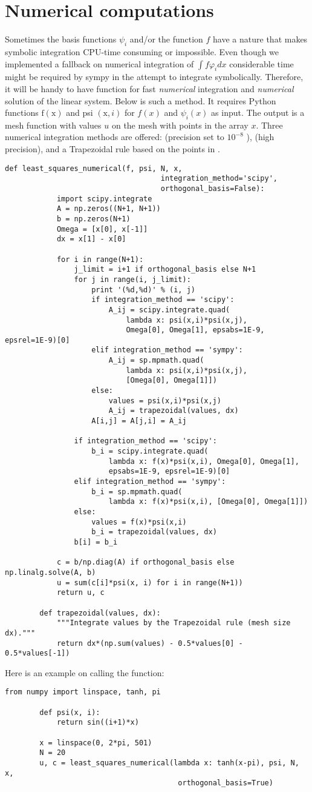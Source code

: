 \documentclass[../main.tex]{subfiles}
\begin{document}
	\section[Numerical computations]{Numerical computations}
	\label{sec:sec_2_9}
	\noindent Sometimes the basis functions $\psi_{i}$ and/or the function $f$ have a nature that makes symbolic integration CPU-time consuming or impossible. Even though we implemented a fallback on numerical integration of $\int f \varphi_{i} d x$ considerable time might be required by sympy in the attempt to integrate symbolically. Therefore, it will be handy to have function for fast \textit{numerical} integration and \textit{numerical} solution of the linear system. Below is such a method. It requires Python functions $\mathrm{f}(\mathrm{x})$ and psi $(\mathrm{x}, i)$ for $f(x)$ and $\psi_{i}(x)$ as input. The output is a mesh function with values $u$ on the mesh with points in the array $x$. Three numerical integration methods are offered:  (precision set to $10^{-8}$ ),  (high precision), and a Trapezoidal rule based on the points in .
	\begin{lstlisting}[numbers=none]
		def least_squares_numerical(f, psi, N, x,
									integration_method='scipy',
									orthogonal_basis=False):
			import scipy.integrate
			A = np.zeros((N+1, N+1))
			b = np.zeros(N+1)
			Omega = [x[0], x[-1]]
			dx = x[1] - x[0]
			
			for i in range(N+1):
				j_limit = i+1 if orthogonal_basis else N+1
				for j in range(i, j_limit):
					print '(%d,%d)' % (i, j)
					if integration_method == 'scipy':
						A_ij = scipy.integrate.quad(
							lambda x: psi(x,i)*psi(x,j),
							Omega[0], Omega[1], epsabs=1E-9, epsrel=1E-9)[0]
					elif integration_method == 'sympy':
						A_ij = sp.mpmath.quad(
							lambda x: psi(x,i)*psi(x,j),
							[Omega[0], Omega[1]])
					else:
						values = psi(x,i)*psi(x,j)
						A_ij = trapezoidal(values, dx)
					A[i,j] = A[j,i] = A_ij
			
				if integration_method == 'scipy':
					b_i = scipy.integrate.quad(			
						lambda x: f(x)*psi(x,i), Omega[0], Omega[1],
						epsabs=1E-9, epsrel=1E-9)[0]
				elif integration_method == 'sympy':
					b_i = sp.mpmath.quad(
						lambda x: f(x)*psi(x,i), [Omega[0], Omega[1]])
				else:
					values = f(x)*psi(x,i)
					b_i = trapezoidal(values, dx)
				b[i] = b_i
			
			c = b/np.diag(A) if orthogonal_basis else np.linalg.solve(A, b)
			u = sum(c[i]*psi(x, i) for i in range(N+1))
			return u, c
			
		def trapezoidal(values, dx):
			"""Integrate values by the Trapezoidal rule (mesh size dx)."""
			return dx*(np.sum(values) - 0.5*values[0] - 0.5*values[-1])
	\end{lstlisting}
	Here is an example on calling the function:
	\begin{lstlisting}[numbers=none]
		from numpy import linspace, tanh, pi
		
		def psi(x, i):
			return sin((i+1)*x)
			
		x = linspace(0, 2*pi, 501)
		N = 20
		u, c = least_squares_numerical(lambda x: tanh(x-pi), psi, N, x,
										orthogonal_basis=True)
	\end{lstlisting}
\end{document}
